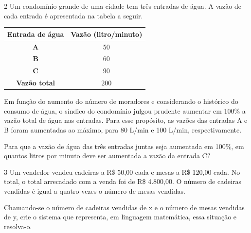 \pagebreak
\num{2} Um condomínio grande de uma cidade tem três entradas de água. A
vazão de cada entrada é apresentada na tabela a seguir.

\begin{center}
\begin{tabular}{|cc}
\hline
\textbf{Entrada de água} & \multicolumn{1}{c|}{\textbf{Vazão (litro/minuto)}} \\ \hline
\textbf{A} & 50 \\ \hline
\textbf{B} & 60 \\ \hline
\textbf{C} & 90 \\ \hline
\textbf{Vazão total} & 200 \\ \hline
\end{tabular}
\end{center}

Em função do aumento do número de moradores e considerando o histórico
do consumo de água, o síndico do condomínio julgou prudente aumentar em
100\% a vazão total de água nas entradas. Para esse propósito,
as vazões das entradas A e B foram aumentadas ao máximo, para 80 L/min e
100 L/min, respectivamente.

Para que a vazão de água das três entradas juntas seja aumentada em
100\%, em quantos litros por minuto deve ser aumentada a vazão da entrada C?

\begin{emptybox}
\end{emptybox}

\num{3} Um vendedor vendeu cadeiras a R\$ 50,00 cada e mesas a R\$ 120,00
cada. No total, o total arrecadado com a venda foi de R\$ 4.800,00. O número 
de cadeiras vendidas é igual a quatro vezes o número de mesas vendidas.

Chamando-se o número de cadeiras vendidas de x e o número de mesas
vendidas de y, crie o sistema que representa, em linguagem
matemática, essa situação e resolva-o.

\begin{emptybox}
\coment{
\vspace{5cm}

}
\end{emptybox}


